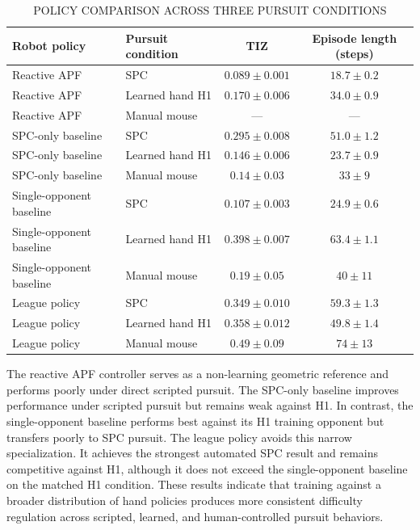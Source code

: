 \documentclass[lettersize,journal]{IEEEtran}
\begin{document}
\begin{table}[!t]
\caption{POLICY COMPARISON ACROSS THREE PURSUIT CONDITIONS}
\label{tab:policy-comparison}
\centering
\footnotesize
\setlength{\tabcolsep}{5pt}
\renewcommand{\arraystretch}{1.08}
\begin{tabularx}{\textwidth}{@{}>{\raggedright\arraybackslash}X >{\raggedright\arraybackslash}X c c@{}}
\toprule
Robot policy & Pursuit condition & TIZ & Episode length (steps) \\
\midrule
Reactive APF & SPC & $0.089 \pm 0.001$ & $18.7 \pm 0.2$ \\
Reactive APF & Learned hand H1 & $0.170 \pm 0.006$ & $34.0 \pm 0.9$ \\
Reactive APF & Manual mouse & --- & --- \\
SPC-only baseline & SPC & $0.295 \pm 0.008$ & $51.0 \pm 1.2$ \\
SPC-only baseline & Learned hand H1 & $0.146 \pm 0.006$ & $23.7 \pm 0.9$ \\
SPC-only baseline & Manual mouse & $0.14 \pm 0.03$ & $33 \pm 9$ \\
Single-opponent baseline & SPC & $0.107 \pm 0.003$ & $24.9 \pm 0.6$ \\
Single-opponent baseline & Learned hand H1 & $0.398 \pm 0.007$ & $63.4 \pm 1.1$ \\
Single-opponent baseline & Manual mouse & $0.19 \pm 0.05$ & $40 \pm 11$ \\
League policy & SPC & $0.349 \pm 0.010$ & $59.3 \pm 1.3$ \\
League policy & Learned hand H1 & $0.358 \pm 0.012$ & $49.8 \pm 1.4$ \\
League policy & Manual mouse & $0.49 \pm 0.09$ & $74 \pm 13$ \\
\bottomrule
\end{tabularx}
\end{table}

The reactive APF controller serves as a non-learning geometric reference and performs poorly under direct scripted pursuit. The SPC-only baseline improves performance under scripted pursuit but remains weak against H1. In contrast, the single-opponent baseline performs best against its H1 training opponent but transfers poorly to SPC pursuit. The league policy avoids this narrow specialization. It achieves the strongest automated SPC result and remains competitive against H1, although it does not exceed the single-opponent baseline on the matched H1 condition. These results indicate that training against a broader distribution of hand policies produces more consistent difficulty regulation across scripted, learned, and human-controlled pursuit behaviors.
\end{document}
